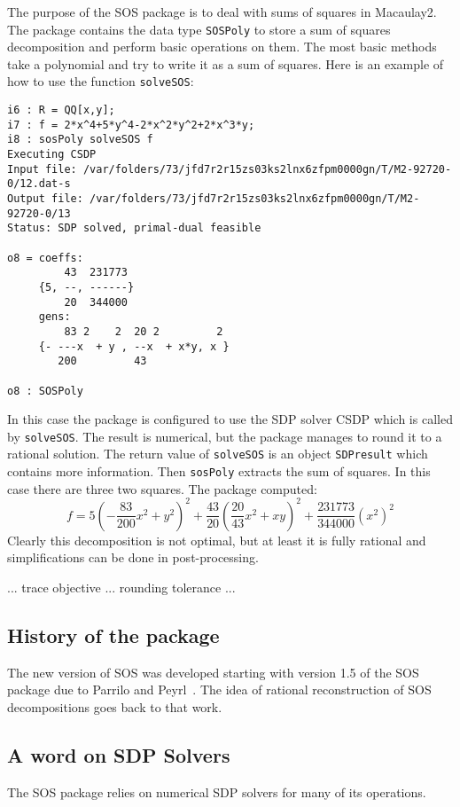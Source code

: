 \documentclass[11pt]{amsart}
\theoremstyle{plain}%
\theoremstyle{definition}
\theoremstyle{remark}
\newcommand{\SOS}{\textsc{SOS}\xspace}
\begin{document}
The purpose of the \SOS package is to deal with sums of squares in
Macaulay2.  The package contains the data type \verb|SOSPoly| to store
a sum of squares decomposition and perform basic operations on them.
The most basic methods take a polynomial and try to write it as a sum
of squares.  Here is an example of how to use the function
\verb|solveSOS|:
\begin{verbatim}
i6 : R = QQ[x,y];
i7 : f = 2*x^4+5*y^4-2*x^2*y^2+2*x^3*y;
i8 : sosPoly solveSOS f
Executing CSDP
Input file: /var/folders/73/jfd7r2r15zs03ks2lnx6zfpm0000gn/T/M2-92720-0/12.dat-s
Output file: /var/folders/73/jfd7r2r15zs03ks2lnx6zfpm0000gn/T/M2-92720-0/13
Status: SDP solved, primal-dual feasible

o8 = coeffs:
         43  231773
     {5, --, ------}
         20  344000
     gens:
         83 2    2  20 2         2
     {- ---x  + y , --x  + x*y, x }
        200         43

o8 : SOSPoly
\end{verbatim}
In this case the package is configured to use the SDP solver CSDP
which is called by \verb|solveSOS|.  The result is numerical, but the
package manages to round it to a rational solution.  The return value
of \verb|solveSOS| is an object \verb|SDPresult| which contains more
information.  Then \verb|sosPoly| extracts the sum of squares.  In
this case there are three two squares.  The package computed:
\[
  f = 5(-\frac{83}{200} x^{2}+y^{2})^{2} + \frac{43}{20}
  (\frac{20}{43}x^{2} + xy)^{2} + \frac{231773}{344000} (x^{2})^{2}
\]
Clearly this decomposition is not optimal, but at least it is fully
rational and simplifications can be done in post-processing.

... trace objective ... rounding tolerance ...

\subsection{History of the package}
The new version of \SOS was developed starting with version 1.5 of the
\SOS package due to Parrilo and Peyrl~\cite{peyrl2008computing}.  The
idea of rational reconstruction of SOS decompositions goes back to
that work.

\subsection{A word on SDP Solvers}
The \SOS package relies on numerical SDP solvers for many of its
operations.
\end{document}

